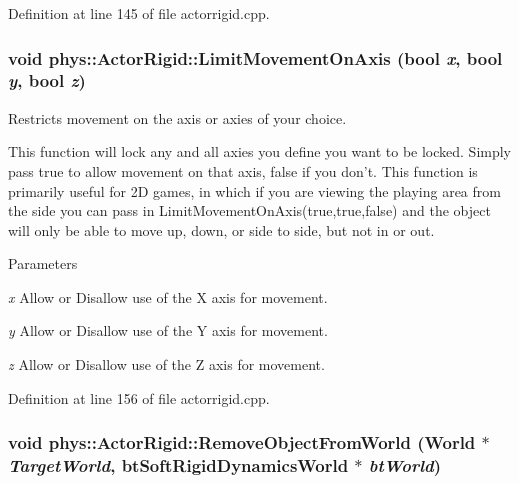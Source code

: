 Definition at line 145 of file actorrigid.cpp.

\hypertarget{classphys_1_1ActorRigid_adaed962ee8ed788612e541fb00867c78}{
\subsubsection[{LimitMovementOnAxis}]{\setlength{\rightskip}{0pt plus 5cm}void phys::ActorRigid::LimitMovementOnAxis (bool {\em x}, \/  bool {\em y}, \/  bool {\em z})}}
\label{d8/d71/classphys_1_1ActorRigid_adaed962ee8ed788612e541fb00867c78}


Restricts movement on the axis or axies of your choice. 

This function will lock any and all axies you define you want to be locked. Simply pass true to allow movement on that axis, false if you don't. This function is primarily useful for 2D games, in which if you are viewing the playing area from the side you can pass in LimitMovementOnAxis(true,true,false) and the object will only be able to move up, down, or side to side, but not in or out. 
\begin{DoxyParams}{Parameters}
\item[{\em x}]Allow or Disallow use of the X axis for movement. \item[{\em y}]Allow or Disallow use of the Y axis for movement. \item[{\em z}]Allow or Disallow use of the Z axis for movement. \end{DoxyParams}


Definition at line 156 of file actorrigid.cpp.

\hypertarget{classphys_1_1ActorRigid_a74a4eaa5491b90a977e9db0457271f31}{
\subsubsection[{RemoveObjectFromWorld}]{\setlength{\rightskip}{0pt plus 5cm}void phys::ActorRigid::RemoveObjectFromWorld ({\bf World} $\ast$ {\em TargetWorld}, \/  btSoftRigidDynamicsWorld $\ast$ {\em btWorld})}}
\label{d8/d71/classphys_1_1ActorRigid_a74a4eaa5491b90a977e9db0457271f31}



